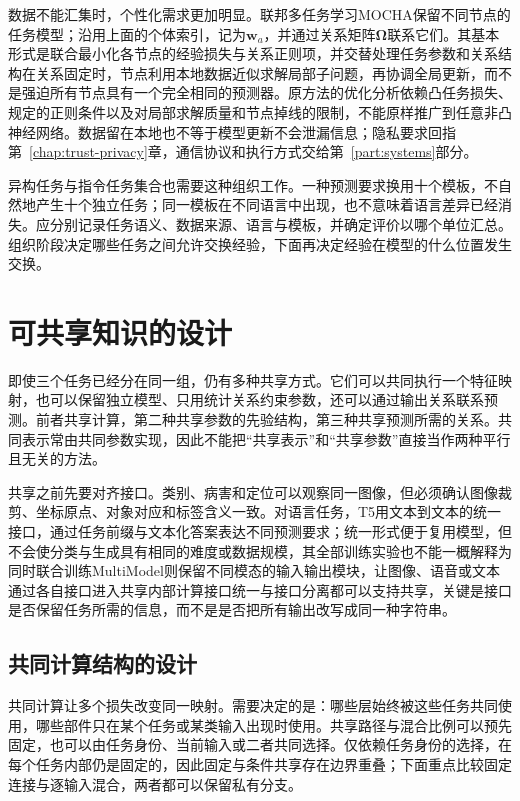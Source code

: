 数据不能汇集时，个性化需求更加明显。联邦多任务学习MOCHA保留不同节点的任务模型；沿用上面的个体索引，记为$\bm w_a$，并通过关系矩阵$\bm\Omega$联系它们。其基本形式是联合最小化各节点的经验损失与关系正则项，并交替处理任务参数和关系结构在关系固定时，节点利用本地数据近似求解局部子问题，再协调全局更新，而不是强迫所有节点具有一个完全相同的预测器。原方法的优化分析依赖凸任务损失、规定的正则条件以及对局部求解质量和节点掉线的限制，不能原样推广到任意非凸神经网络。数据留在本地也不等于模型更新不会泄漏信息；隐私要求回指第~\ref{chap:trust-privacy}章，通信协议和执行方式交给第~\ref{part:systems}部分。

异构任务与指令任务集合也需要这种组织工作。一种预测要求换用十个模板，不自然地产生十个独立任务；同一模板在不同语言中出现，也不意味着语言差异已经消失。应分别记录任务语义、数据来源、语言与模板，并确定评价以哪个单位汇总。组织阶段决定哪些任务之间允许交换经验，下面再决定经验在模型的什么位置发生交换。

\section{可共享知识的设计}
\label{sec:ket-sharing-structure}

即使三个任务已经分在同一组，仍有多种共享方式。它们可以共同执行一个特征映射，也可以保留独立模型、只用统计关系约束参数，还可以通过输出关系联系预测。前者共享计算，第二种共享参数的先验结构，第三种共享预测所需的关系。共同表示常由共同参数实现，因此不能把“共享表示”和“共享参数”直接当作两种平行且无关的方法。

共享之前先要对齐接口。类别、病害和定位可以观察同一图像，但必须确认图像裁剪、坐标原点、对象对应和标签含义一致。对语言任务，T5用文本到文本的统一接口，通过任务前缀与文本化答案表达不同预测要求；统一形式便于复用模型，但不会使分类与生成具有相同的难度或数据规模，其全部训练实验也不能一概解释为同时联合训练MultiModel则保留不同模态的输入输出模块，让图像、语音或文本通过各自接口进入共享内部计算接口统一与接口分离都可以支持共享，关键是接口是否保留任务所需的信息，而不是是否把所有输出改写成同一种字符串。

\subsection{共同计算结构的设计}
\label{sec:ket-sharing-computation}

共同计算让多个损失改变同一映射。需要决定的是：哪些层始终被这些任务共同使用，哪些部件只在某个任务或某类输入出现时使用。共享路径与混合比例可以预先固定，也可以由任务身份、当前输入或二者共同选择。仅依赖任务身份的选择，在每个任务内部仍是固定的，因此固定与条件共享存在边界重叠；下面重点比较固定连接与逐输入混合，两者都可以保留私有分支。

